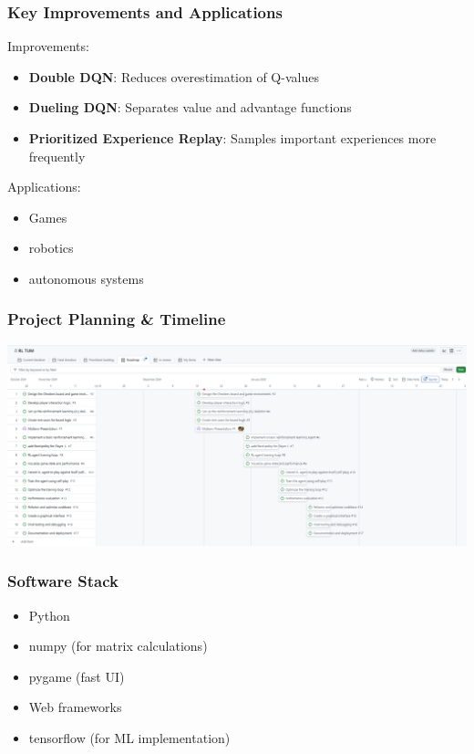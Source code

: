\begin{frame}
	\frametitle{Key Improvements and Applications}
	\vspace{0.5cm}
	Improvements:
		\begin{itemize}		
			\item \textbf{Double DQN}: Reduces overestimation of Q-values
			\item\textbf{Dueling DQN}: Separates value and advantage functions
			\item \textbf{Prioritized Experience Replay}: Samples important experiences more frequently
		\end{itemize}
	\pause
	Applications:
		\begin{itemize}
			\item Games
			\item robotics
			\item autonomous systems
		\end{itemize}
\end{frame}



\begin{frame}
	\frametitle{Project Planning \& Timeline}
	\vspace{0.2cm}
	\includegraphics[scale=0.45]{project-plan}
\end{frame}

\begin{frame}
	\frametitle{Software Stack}
	\vspace{1cm}
	\begin{itemize}
		\item Python
		\item numpy (for matrix calculations)
		\item pygame (fast UI)
		\item Web frameworks
		\item tensorflow (for ML implementation)
	\end{itemize}	
\end{frame}

